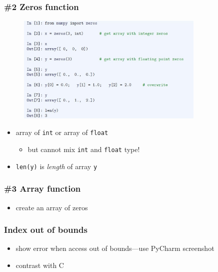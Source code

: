 \documentclass[14pt]{beamer}
\newcommand\red[1]{{\color{red} #1}}
\begin{document}
\begin{frame}[fragile]

\frametitle{\#2 Zeros function}

\vspace*{-3mm}
\begin{figure}[ht]
	\centering
	\includegraphics[width=0.8\textwidth]{figures/LLp49}
\end{figure}
\vspace*{-4mm}	
\begin{itemize}
	\item array of \texttt{int} or array of \texttt{float}
	\begin{itemize}
		\item but cannot mix \texttt{int} and \texttt{float} type!
	\end{itemize}
	\item \texttt{len(y)} is \red{\emph{length}} of array \texttt{y}
\end{itemize}

\end{frame}


\begin{frame}[fragile]

\frametitle{\#3 Array function}

\begin{itemize}
	\item create an array of zeros
\end{itemize}

\end{frame}




\begin{frame}[fragile]

\frametitle{Index out of bounds}

\begin{itemize}
	\item show error when access out of bounds---use PyCharm screenshot
	\item contrast with C
\end{itemize}

\end{frame}
\end{document}
